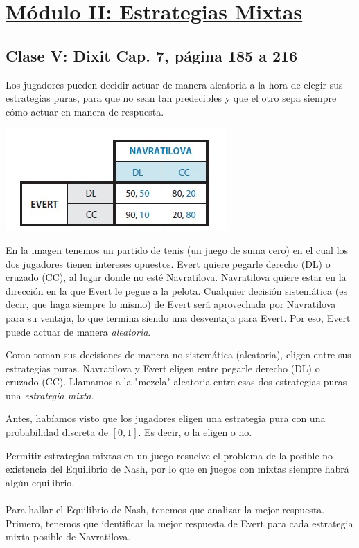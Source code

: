 \documentclass{article}
\begin{document}
\section*{\underline{Módulo II: Estrategias Mixtas}}
    \subsection*{\textbf{Clase V: Dixit Cap. 7, página 185 a 216}}
        Los jugadores pueden decidir actuar de manera aleatoria a la hora de elegir sus estrategias puras, para que no sean tan predecibles y que el otro sepa siempre cómo actuar en manera de respuesta.
        
        \begin{center}
            \includegraphics[width=0.5\linewidth]{figs/fig11.jpeg}
        \end{center}
        
        En la imagen tenemos un partido de tenis (un juego de suma cero) en el cual los dos jugadores tienen intereses opuestos. Evert quiere pegarle derecho (DL) o cruzado (CC), al lugar donde no esté Navratilova. Navratilova quiere estar en la dirección en la que Evert le pegue a la pelota. Cualquier decisión sistemática (es decir, que haga siempre lo mismo) de Evert será aprovechada por Navratilova para su ventaja, lo que termina siendo una desventaja para Evert. Por eso, Evert puede actuar de manera \emph{aleatoria}.

        Como toman sus decisiones de manera no-sistemática (aleatoria), eligen entre sus estrategias puras. Navratilova y Evert eligen entre pegarle derecho (DL) o cruzado (CC). Llamamos a la "mezcla" aleatoria entre esas dos estrategias puras una \emph{estrategia mixta}.

        Antes, habíamos visto que los jugadores eligen una estrategia pura con una probabilidad discreta de $[0, 1]$. Es decir, o la eligen o no.

        Permitir estrategias mixtas en un juego resuelve el problema de la posible no existencia del Equilibrio de Nash, por lo que en juegos con mixtas siempre habrá algún equilibrio.
        \\
        \\
        Para hallar el Equilibrio de Nash, tenemos que analizar la mejor respuesta. Primero, tenemos que identificar la mejor respuesta de Evert para cada estrategia mixta posible de Navratilova.
    
\end{document}
